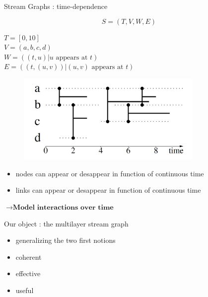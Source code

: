 \documentclass[15pt]{beamer}
\begin{document}
\begin{frame}{Stream Graphs : time-dependence}

\[
	S=(T,V,W,E)
\]
\medskip

\begin{minipage}{0.4\textwidth}
\begin{footnotesize}
$T=[0,10]$\\
$V=(a,b,c,d)$\\
$W = ((t,u) | u \text{ appears at } t)$\\
$E = ((t,(u,v)) | (u,v) \text{ appears at } t)$
\end{footnotesize}
\end{minipage}
\begin{minipage}[r]{0.55\textwidth}
\begin{figure}
    \flushright
    \includegraphics[width=0.8\textwidth]{img/exampleStream.JPG}
    \label{fig:exstream}
\end{figure}
\end{minipage}
\medskip

\begin{itemize}
    \item nodes can appear or desappear in function of continuous time
    \item links can appear or desappear in function of continuous time
\end{itemize}
\smallskip
\centering
$\rightarrow \textbf{Model interactions over time}$





\end{frame}

\begin{frame}{Our object : the multilayer stream graph}
	\begin{itemize}
		\item generalizing the two first notions
		\item coherent 
		\item effective
		\item useful
	\end{itemize}
\end{frame}
\end{document}
